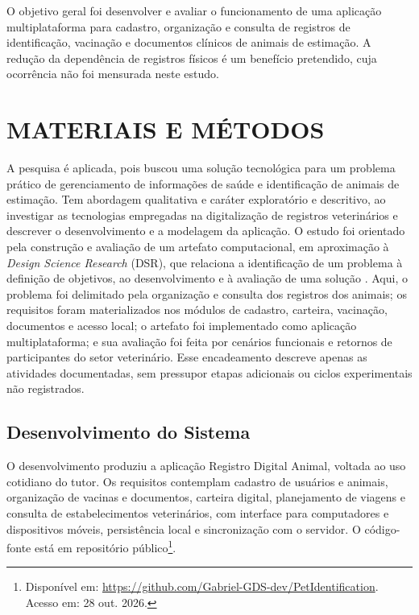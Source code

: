\documentclass{UNESC}
\begin{document}
O objetivo geral foi desenvolver e avaliar o funcionamento de uma aplicação multiplataforma para cadastro, organização e consulta de registros de identificação, vacinação e documentos clínicos de animais de estimação. A redução da dependência de registros físicos é um benefício pretendido, cuja ocorrência não foi mensurada neste estudo.

\section{MATERIAIS E MÉTODOS}

A pesquisa é aplicada, pois buscou uma solução tecnológica para um problema prático de gerenciamento de informações de saúde e identificação de animais de estimação. Tem abordagem qualitativa e caráter exploratório e descritivo, ao investigar as tecnologias empregadas na digitalização de registros veterinários e descrever o desenvolvimento e a modelagem da aplicação. O estudo foi orientado pela construção e avaliação de um artefato computacional, em aproximação à \textit{Design Science Research} (DSR), que relaciona a identificação de um problema à definição de objetivos, ao desenvolvimento e à avaliação de uma solução \cite{peffers2007}. Aqui, o problema foi delimitado pela organização e consulta dos registros dos animais; os requisitos foram materializados nos módulos de cadastro, carteira, vacinação, documentos e acesso local; o artefato foi implementado como aplicação multiplataforma; e sua avaliação foi feita por cenários funcionais e retornos de participantes do setor veterinário. Esse encadeamento descreve apenas as atividades documentadas, sem pressupor etapas adicionais ou ciclos experimentais não registrados.

\subsection{Desenvolvimento do Sistema}

O desenvolvimento produziu a aplicação Registro Digital Animal, voltada ao uso cotidiano do tutor. Os requisitos contemplam cadastro de usuários e animais, organização de vacinas e documentos, carteira digital, planejamento de viagens e consulta de estabelecimentos veterinários, com interface para computadores e dispositivos móveis, persistência local e sincronização com o servidor. O código-fonte está em repositório público\footnote{Disponível em: \url{https://github.com/Gabriel-GDS-dev/PetIdentification}. Acesso em: 28 out. 2026.}.
\end{document}
